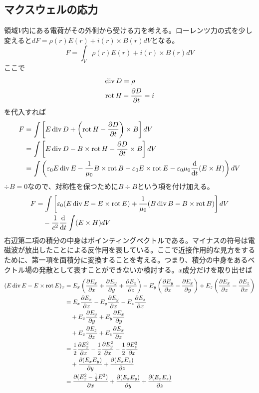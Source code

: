 \subsection{マクスウェルの応力}
    領域$V$内にある電荷がその外側から受ける力を考える。ローレンツ力の式を少し変えると$dF = \rho(r)E(r) + i(r) \times B(r) dV$となる。
        \[F = \int_V \rho(r)E(r) + i(r)\times B(r)dV\]
    ここで
    \begin{align*}
        \div D &= \rho\\
        \rot H &- \pd[D]{t} = i
    \end{align*}
    を代入すれば
    \begin{align*}
        F   &= \int \left[E \div D + \left(\rot H - \pd[D]{t}\right) \times B\right] dV\\
            &= \int \left[E \div D - B \times \rot H - \pd[D]{t} \times B\right] dV\\
            &= \int \left(\epsilon_0E \div E - \frac{1}{\mu_0}B \times \rot B - \epsilon_0E \times \rot E - \epsilon_0\mu_0\dv{t}(E \times H)\right) dV
    \end{align*}
    $\div B = 0$なので、対称性を保つために$B \div B$という項を付け加える。
    \begin{align*}
        F   &= \int \left[\epsilon_0(E \div E - E \times \rot E) + \frac{1}{\mu_0}(B \div B - B \times \rot B)\right] dV\\
            &\quad - \frac{1}{c^2}\dv{t} \int (E \times H) dV
    \end{align*}
    右辺第二項の積分の中身はポインティングベクトルである。マイナスの符号は電磁波が放出したことによる反作用を表している。ここで近接作用的な見方をするために、第一項を面積分に変換することを考える。つまり、積分の中身をあるベクトル場の発散として表すことができないか検討する。$x$成分だけを取り出せば
    \begin{align*}
        (E\div E - E \times \rot E)_x
            &= E_x\left(\pd[E_x]{x} + \pd[E_y]{y} + \pd[E_z]{z}\right) - E_y\left(\pd[E_y]{x} - \pd[E_x]{y}\right) + E_z\left(\pd[E_x]{z} - \pd[E_z]{x}\right)\\
            &= E_x\pd[E_x]{x} - E_y\pd[E_y]{x} - E_z\pd[E_z]{x}\\
            &\quad + E_x\pd[E_y]{y} + E_y\pd[E_x]{y}\\
            &\quad + E_x\pd[E_z]{z} + E_z\pd[E_x]{z}\\
            &= \frac{1}{2}\pd[E_x^2]{x} - \frac{1}{2}\pd[E_y^2]{x} - \frac{1}{2}\pd[E_z^2]{x}\\
            &\quad + \pd[(E_xE_y)]{y} + \pd[(E_xE_z)]{z}\\
            &= \pd[(E_x^2 - \frac{1}{2}E^2)]{x} + \pd[(E_xE_y)]{y} + \pd[(E_xE_z)]{z}
    \end{align*}
